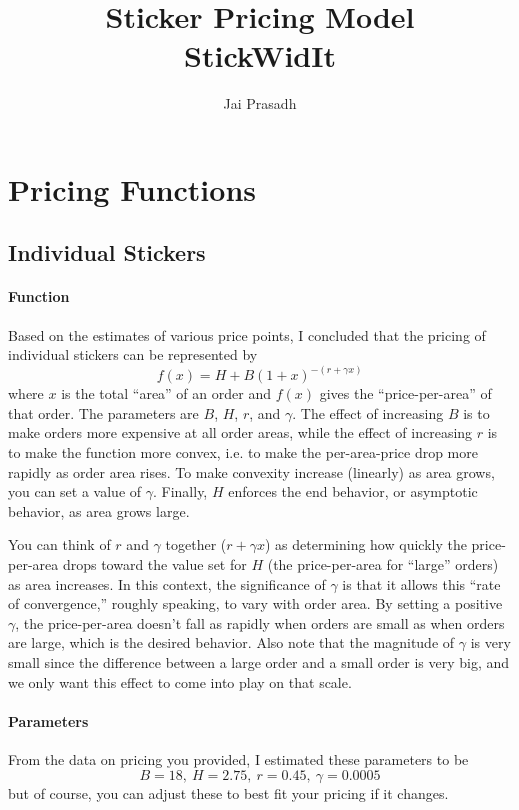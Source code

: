 \documentclass{article}
\title{Sticker Pricing Model \\ \large StickWidIt}
\author{Jai Prasadh}
\begin{document}
\maketitle

\section{Pricing Functions}

\subsection{Individual Stickers}
\paragraph{Function}
Based on the estimates of various price points, I concluded that the pricing of individual stickers can be represented by
\begin{equation}\label{eq:1}
f(x) = H+B(1+x)^{-(r+\gamma x)}
\end{equation} 
where $x$ is the total ``area'' of an order and $f(x)$ gives the ``price-per-area'' of that order. The parameters are $B$, $H$, $r$, and $\gamma$. The effect of increasing $B$ is to make orders more expensive at all order areas, while the effect of increasing $r$ is to make the function more convex, i.e. to make the per-area-price drop more rapidly as order area rises. To make convexity increase (linearly) as area grows, you can set a value of $\gamma$. Finally, $H$ enforces the end behavior, or asymptotic behavior, as area grows large.

You can think of $r$ and $\gamma$ together ($r+\gamma x$) as determining how quickly the price-per-area drops toward the value set for $H$ (the price-per-area for ``large'' orders) as area increases. In this context, the significance of $\gamma$ is that it allows this ``rate of convergence,'' roughly speaking, to vary with order area. By setting a positive $\gamma$, the price-per-area doesn't fall as rapidly when orders are small as when orders are large, which is the desired behavior. Also note that the magnitude of $\gamma$ is very small since the difference between a large order and a small order is very big, and we only want this effect to come into play on that scale.

\paragraph{Parameters}
From the data on pricing you provided, I estimated these parameters to be 
\[ B=18, \ H=2.75, \ r=0.45, \ \gamma=0.0005 \]
but of course, you can adjust these to best fit your pricing if it changes.
\end{document}
